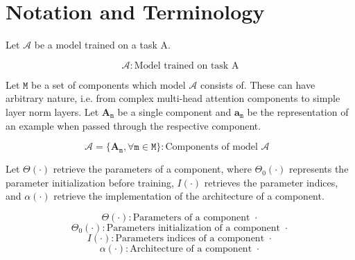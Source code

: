 
\section{Notation and Terminology}

Let $\mathcal{A}$ be a model trained on a task A.

\begin{equation}
    \mathcal{A}: \text{Model trained on task A} 
\end{equation}

Let $\mathtt{M}$ be a set of components which model $\mathcal{A}$  consists of. These can have arbitrary nature, i.e. from complex multi-head attention components to simple layer norm layers. Let $\textbf{A}_\mathtt{m}$ be a single component and $\textbf{a}_\mathtt{m}$ be the representation of an example when passed through the respective component.

\begin{equation}
    \mathcal{A} = \{\textbf{A}_\mathtt{m},  \forall \mathtt{m} \in \mathtt{M} \} : \text{Components of model $\mathcal{A}$ }
\end{equation}

Let $\Theta(\cdot)$ retrieve the parameters of a component, where $\Theta_0(\cdot)$ represents the parameter initialization before training, $I(\cdot)$ retrieves the parameter indices, and $\alpha(\cdot)$ retrieve the implementation of the architecture of a component. 

\begin{equation}
    \Theta(\cdot) : \text{Parameters of a component } \cdot
\end{equation}
\begin{equation}
    \Theta_0(\cdot) : \text{Parameters initialization of a component } \cdot
\end{equation}
\begin{equation}
    I(\cdot) : \text{Parameters indices of a component } \cdot
\end{equation}
\begin{equation}
    \alpha(\cdot) : \text{Architecture of a component } \cdot
\end{equation}



